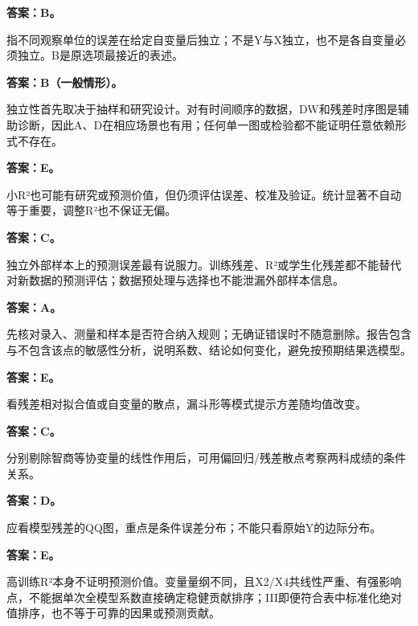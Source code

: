 
\textbf{答案：B。}

指不同观察单位的误差在给定自变量后独立；不是Y与X独立，也不是各自变量必须独立。B是原选项最接近的表述。



\textbf{答案：B（一般情形）。}

独立性首先取决于抽样和研究设计。对有时间顺序的数据，DW和残差时序图是辅助诊断，因此A、D在相应场景也有用；任何单一图或检验都不能证明任意依赖形式不存在。



\textbf{答案：E。}

小R²也可能有研究或预测价值，但仍须评估误差、校准及验证。统计显著不自动等于重要，调整R²也不保证无偏。



\textbf{答案：C。}

独立外部样本上的预测误差最有说服力。训练残差、R²或学生化残差都不能替代对新数据的预测评估；数据预处理与选择也不能泄漏外部样本信息。



\textbf{答案：A。}

先核对录入、测量和样本是否符合纳入规则；无确证错误时不随意删除。报告包含与不包含该点的敏感性分析，说明系数、结论如何变化，避免按预期结果选模型。



\textbf{答案：E。}

看残差相对拟合值或自变量的散点，漏斗形等模式提示方差随均值改变。



\textbf{答案：C。}

分别剔除智商等协变量的线性作用后，可用偏回归/残差散点考察两科成绩的条件关系。



\textbf{答案：D。}

应看模型残差的QQ图，重点是条件误差分布；不能只看原始Y的边际分布。



\textbf{答案：E。}

高训练R²本身不证明预测价值。变量量纲不同，且X2/X4共线性严重、有强影响点，不能据单次全模型系数直接确定稳健贡献排序；III即便符合表中标准化绝对值排序，也不等于可靠的因果或预测贡献。


